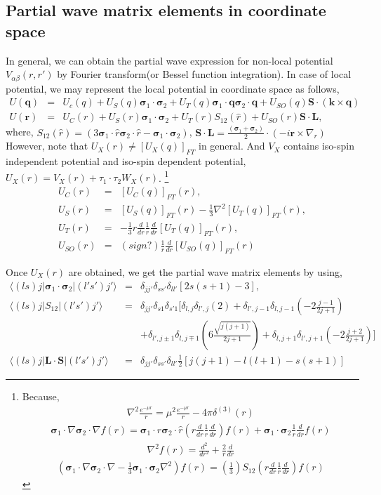 \documentclass[10pt]{article}
\def\bm{\boldsymbol}
\newcommand{\bea}{\begin{eqnarray}}
\newcommand{\eea}{\end{eqnarray}}
\newcommand{\no}{\nonumber \\}
\def\vs{{\bm \sigma}}
\def\vq{{\bm q}}
\def\vk{{\bm k}}
\def\vr{{\bm r}}
\def\la{\langle}
\def\ra{\rangle}
\begin{document}
\subsection{Partial wave matrix elements in coordinate space}
In general, we can obtain the partial wave expression
for non-local potential $V_{\alpha\beta}(r,r')$
by Fourier transform(or Bessel function integration).
In case of local potential, we may represent the local
potential in coordinate space as follows,
\bea
U(\vq)&=&U_c(q)+U_S(q)\vs_1\cdot\vs_2
        +U_T(q)\vs_1\cdot\vq\vs_2\cdot\vq
        +U_{SO}(q){\bm S}\cdot(\vk\times\vq)\no   
U(\vr)&=&U_C(r)+U_S(r)\vs_1\cdot\vs_2
      +U_T(r)S_{12}(\hat{r})
      +U_{SO}(r){\bm S}\cdot{\bm L},
\eea
where, $S_{12}(\hat{r})=(3\vs_1\cdot\hat{r}\vs_2\cdot\hat{r}
-\vs_1\cdot\vs_2)$, 
${\bm S}\cdot{\bm L}=\frac{(\vs_1+\vs_2)}{2}\cdot(-i\vr\times\nabla_r)$
However, note that $U_X(r)\neq [U_X(q)]_{FT}$ in general.
And $V_X$ contains iso-spin independent potential
and iso-spin dependent potential, $U_X(r)=V_X(r)+\tau_1\cdot\tau_2 W_X(r)$.
\footnote{ Because,
\bea
\nabla^2\frac{e^{-\mu r}}{r}=\mu^2\frac{e^{-\mu r}}{r}-4\pi\delta^{(3)}(r)
\eea
\bea
\vs_1\cdot\nabla\vs_2\cdot\nabla f(r)
=\vs_1\cdot\hat{r}\vs_2\cdot\hat{r}(r\frac{d}{dr}\frac{1}{r}\frac{d}{dr})f(r)+\vs_1\cdot\vs_2\frac{1}{r}\frac{d}{dr}f(r)
\eea
\bea
\nabla^2f(r)=\frac{d^2}{dr^2}+\frac{2}{r}\frac{d}{dr}
\eea
\bea
(\vs_1\cdot\nabla\vs_2\cdot\nabla-\frac{1}{3}\vs_1\cdot\vs_2\nabla^2)
f(r)
=(\frac{1}{3})S_{12}(r\frac{d}{dr}\frac{1}{r}\frac{d}{dr})f(r)
\eea
}
\bea
U_C(r)&=&[U_C(q)]_{FT}(r),\no
U_S(r)&=&[U_S(q)]_{FT}(r)-\frac{1}{3}\nabla^2[U_T(q)]_{FT}(r),\no
U_T(r)&=&-\frac{1}{3}r\frac{d}{dr}\frac{1}{r}\frac{d}{dr}
          [U_T(q)]_{FT}(r),\no
U_{SO}(r)&=&(sign?)\frac{1}{r}\frac{d}{dr}[U_{SO}(q)]_{FT}(r)
\eea


Once $U_X(r)$ are obtained, we get the partial wave matrix elements by using,
\bea
\la (ls)j|\vs_1\cdot\vs_2|(l's')j'\ra&=&
\delta_{j j'}\delta_{s s'}\delta_{l l'}[2s(s+1)-3]
,\no
\la (ls)j|S_{12}|(l's')j'\ra
&=&\delta_{j j'}\delta_{s 1}\delta_{s'1} 
[\delta_{l,j}\delta_{l',j}(2)
+\delta_{l',j-1}\delta_{l,j-1}(-2\frac{j-1}{2j+1})
\no & &
+\delta_{l',j\pm 1}\delta_{l,j\mp 1}(6\frac{\sqrt{j(j+1)}}{2j+1})
+\delta_{l,j+1}\delta_{l',j+1}(-2\frac{j+2}{2j+1})
]
\no
\la (ls)j|{\bm L}\cdot{\bm S}|(l's')j'\ra
&=&\delta_{j j'}\delta_{s s'}\delta_{l l'}
   \frac{1}{2}[j(j+1)-l(l+1)-s(s+1)]
\eea 

 
\end{document}
